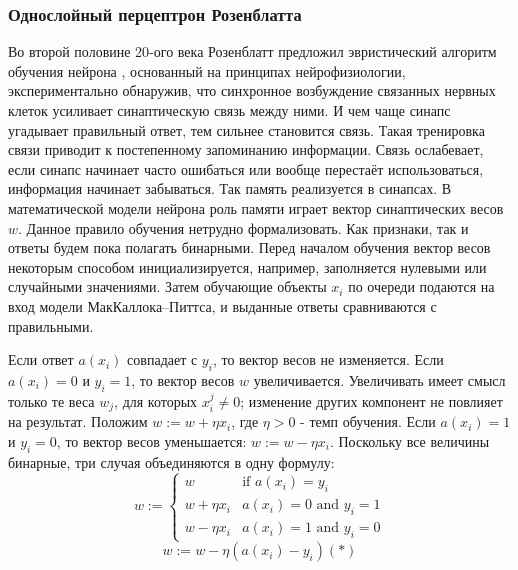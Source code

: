 \documentclass[../body.tex]{subfiles}
\begin{document}
\subsubsection{Однослойный перцептрон Розенблатта}

Во второй половине 20-ого века Розенблатт предложил эвристический алгоритм обучения нейрона \cite{rosenblatt} \cite{vorontsov}, основанный на принципах нейрофизиологии, экспериментально обнаружив, что синхронное возбуждение связанных нервных клеток усиливает синаптическую связь между ними. И чем чаще синапс угадывает правильный ответ, тем сильнее становится связь. Такая тренировка связи приводит к постепенному запоминанию информации. Связь ослабевает, если синапс начинает часто ошибаться или вообще перестаёт использоваться, информация начинает забываться. Так память реализуется в синапсах. В математической модели нейрона роль памяти играет вектор синаптических весов $w$. 
Данное правило обучения нетрудно формализовать. Как признаки, так и ответы будем пока полагать бинарными. Перед началом обучения вектор весов некоторым способом инициализируется, например, заполняется нулевыми или случайными значениями. Затем обучающие объекты  $x_i$ по очереди подаются на вход модели МакКаллока–Питтса, и выданные ответы сравниваются с правильными.

Если ответ $a(x_i)$ совпадает с $y_i$, то вектор весов не изменяется.
Если  $a(x_i) = 0$ и $y_i = 1$, то вектор весов $w$ увеличивается. Увеличивать имеет смысл только те веса $w_j$, для которых $x_i^j \neq 0$; изменение других компонент не повлияет на результат. Положим $w := w + \eta x_i$, где $\eta > 0$ - темп обучения.
Если $a(x_i) = 1$ и $y_i = 0$, то вектор весов уменьшается:  $w := w - \eta x_i$.
Поскольку все величины бинарные, три случая объединяются в одну формулу:
\begin{equation*}
	w := 
	\begin{cases}
		w &\text{if $a(x_i) = y_i$}\\
		w + \eta x_i &\text{$a(x_i) = 0$ and $y_i = 1$}\\
		w - \eta x_i &\text{$a(x_i) = 1$ and $y_i = 0$}
	\end{cases}
\end{equation*}
$$w := w - \eta(a(x_i) -  y_i)(*)$$
\end{document}
